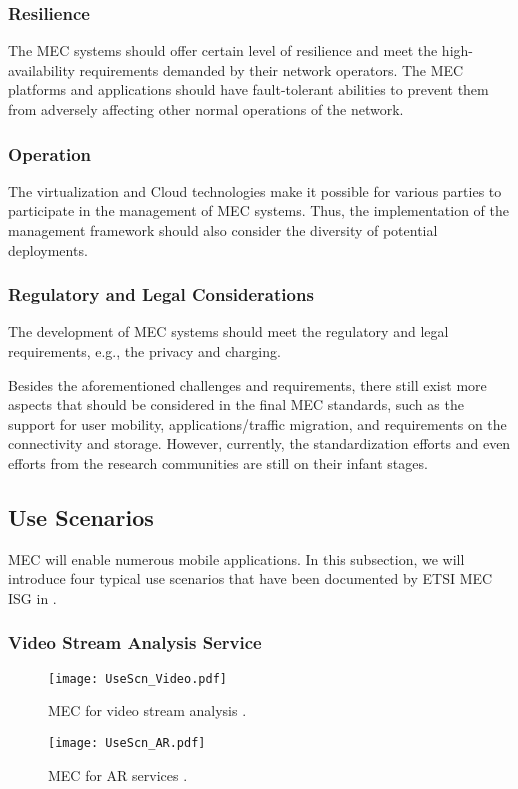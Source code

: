 \documentclass[journal]{IEEEtran}
\begin{document}
{\subsubsection{\textbf{Resilience}} The MEC systems should offer certain level of resilience and meet the high-availability requirements demanded by their network operators. The MEC platforms and applications should have  fault-tolerant abilities to prevent them from adversely affecting other normal operations of the network.

\subsubsection{\textbf{Operation}} The virtualization and Cloud technologies make it possible for various parties to participate in the management of MEC systems. Thus, the implementation of the management framework should also consider the diversity of potential deployments.

\subsubsection{\textbf{Regulatory and Legal Considerations}} The development of MEC systems should meet the regulatory and legal requirements, e.g., the privacy and charging.

Besides the aforementioned challenges and requirements, there still exist more aspects that should be considered in the final MEC standards, such as the support for user mobility, applications/traffic migration, and requirements on the connectivity and storage. However, currently, the standardization efforts and even efforts from the research communities are still on their infant stages.
\subsection{Use Scenarios}
\label{UseScenarios}
MEC will enable numerous mobile applications. In this subsection, we will introduce four typical use scenarios that have been documented by ETSI MEC ISG in \cite{ETSI_ServiceScenarios}.

\subsubsection{\textbf{Video Stream Analysis Service}}
\begin{figure*}[!h]
\begin{center}
   \texttt{[image: UseScn\_Video.pdf]}
\end{center}
\caption{MEC for video stream analysis \cite{ETSI14}.}
\label{UseScnVideo}
\end{figure*}
\begin{figure*}[!t]
\begin{center}
   \texttt{[image: UseScn\_AR.pdf]}
\end{center}
\caption{MEC for AR services \cite{ETSI14}.}
\label{UseScnAR}
\end{figure*}

}
\end{document}
